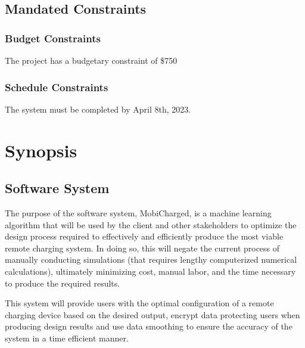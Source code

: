 \documentclass[12pt, titlepage]{article}
\begin{document}
\subsection{Mandated Constraints}

\subsubsection{Budget Constraints}

The project has a budgetary constraint of \$750

\subsubsection{Schedule Constraints}

The system must be completed by April 8th, 2023.

\section{Synopsis}
\subsection{Software System}
The purpose of the software system, MobiCharged, is a machine learning algorithm that will be used by the client and other stakeholders to optimize the design process required to effectively and efficiently produce the most viable remote charging system. In doing so, this will negate the current process of manually conducting simulations (that requires lengthy computerized numerical calculations), ultimately minimizing cost, manual labor, and the time necessary to produce the required results. 
\par
This system will provide users with the optimal configuration of a remote charging device based on the desired output, encrypt data protecting users when producing design results and use data smoothing to ensure the accuracy of the system in a time efficient manner.
\end{document}
